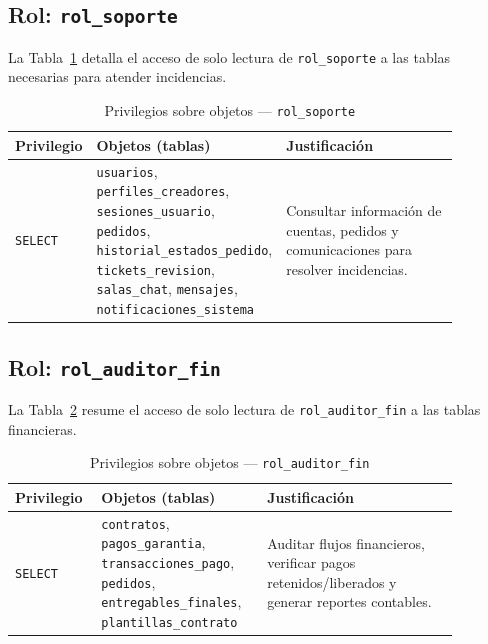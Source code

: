 \documentclass[conference, onecolumn]{IEEEtran}
\begin{document}
\subsection{Rol: \texttt{rol\_soporte}}

La Tabla~\ref{tab:priv_soporte} detalla el acceso de solo lectura de \texttt{rol\_soporte} a las tablas necesarias para atender incidencias.

\begin{table}[H]
\centering
\caption{Privilegios sobre objetos — \texttt{rol\_soporte}}
\label{tab:priv_soporte}
\scriptsize
\begin{tabular}{>{\raggedright\arraybackslash}p{0.14\linewidth} >{\raggedright\arraybackslash}p{0.34\linewidth} >{\raggedright\arraybackslash}p{0.40\linewidth}}
\toprule
\textbf{Privilegio} & \textbf{Objetos (tablas)} & \textbf{Justificación} \\
\midrule
\texttt{SELECT} & \texttt{usuarios}, \texttt{perfiles\_creadores}, \texttt{sesiones\_usuario}, \texttt{pedidos}, \texttt{historial\_estados\_pedido}, \texttt{tickets\_revision}, \texttt{salas\_chat}, \texttt{mensajes}, \texttt{notificaciones\_sistema} & Consultar información de cuentas, pedidos y comunicaciones para resolver incidencias. \\
\bottomrule
\end{tabular}
\end{table}

\subsection{Rol: \texttt{rol\_auditor\_fin}}

La Tabla~\ref{tab:priv_auditor} resume el acceso de solo lectura de \texttt{rol\_auditor\_fin} a las tablas financieras.

\begin{table}[H]
\centering
\caption{Privilegios sobre objetos — \texttt{rol\_auditor\_fin}}
\label{tab:priv_auditor}
\scriptsize
\begin{tabular}{>{\raggedright\arraybackslash}p{0.14\linewidth} >{\raggedright\arraybackslash}p{0.34\linewidth} >{\raggedright\arraybackslash}p{0.40\linewidth}}
\toprule
\textbf{Privilegio} & \textbf{Objetos (tablas)} & \textbf{Justificación} \\
\midrule
\texttt{SELECT} & \texttt{contratos}, \texttt{pagos\_garantia}, \texttt{transacciones\_pago}, \texttt{pedidos}, \texttt{entregables\_finales}, \texttt{plantillas\_contrato} & Auditar flujos financieros, verificar pagos retenidos/liberados y generar reportes contables. \\
\bottomrule
\end{tabular}
\end{table}
\end{document}
